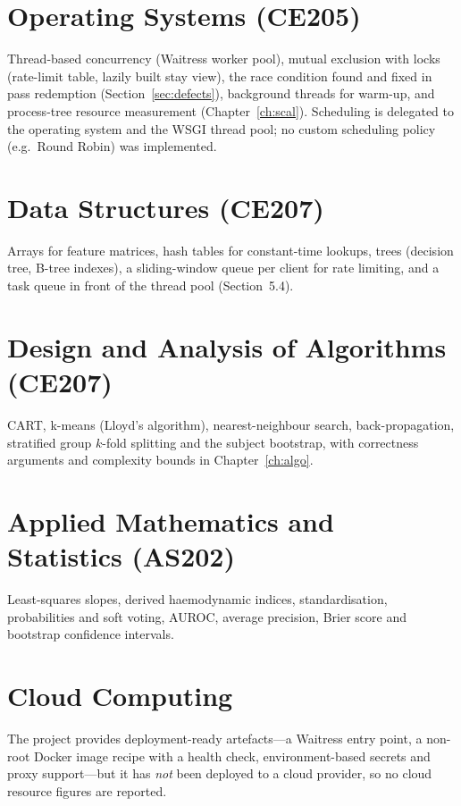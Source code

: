 \section{Operating Systems (CE205)}
Thread-based concurrency (Waitress worker pool), mutual exclusion with locks (rate-limit table, lazily
built stay view), the race condition found and fixed in pass redemption (Section~\ref{sec:defects}),
background threads for warm-up, and process-tree resource measurement (Chapter~\ref{ch:scal}). Scheduling
is delegated to the operating system and the WSGI thread pool; no custom scheduling policy (e.g.\ Round
Robin) was implemented.

\section{Data Structures (CE207)}
Arrays for feature matrices, hash tables for constant-time lookups, trees (decision tree, B-tree indexes),
a sliding-window queue per client for rate limiting, and a task queue in front of the thread pool
(Section~5.4).

\section{Design and Analysis of Algorithms (CE207)}
CART, k-means (Lloyd's algorithm), nearest-neighbour search, back-propagation, stratified group $k$-fold
splitting and the subject bootstrap, with correctness arguments and complexity bounds in
Chapter~\ref{ch:algo}.

\section{Applied Mathematics and Statistics (AS202)}
Least-squares slopes, derived haemodynamic indices, standardisation, probabilities and soft voting, AUROC,
average precision, Brier score and bootstrap confidence intervals.

\section{Cloud Computing}
The project provides deployment-ready artefacts---a Waitress entry point, a non-root Docker image recipe
with a health check, environment-based secrets and proxy support---but it has \emph{not} been deployed to a
cloud provider, so no cloud resource figures are reported.

